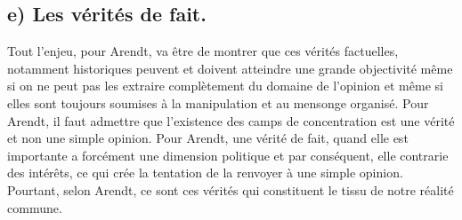 \documentclass[12pt]{article}
\begin{document}
\subsection*{e) Les vérités de fait.}
Tout l'enjeu, pour Arendt, va être de montrer que ces vérités factuelles, notamment historiques peuvent et doivent atteindre une grande objectivité même si on ne peut pas les extraire complètement du domaine de l'opinion et même si elles sont toujours soumises à la manipulation et au mensonge organisé.
Pour Arendt, il faut admettre que l'existence des camps de concentration est une vérité et non une simple opinion.
Pour Arendt, une vérité de fait, quand elle est importante a forcément une dimension politique et par conséquent, elle contrarie des intérêts, ce qui crée la tentation de la renvoyer à une simple opinion.
Pourtant, selon Arendt, ce sont ces vérités qui constituent le tissu de notre réalité commune. 
\end{document}
